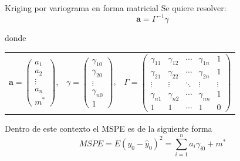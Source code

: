 \documentclass[12pts]{beamer}
\begin{document}
	\begin{frame}{Kriging por variograma en forma matricial}
		Se quiere resolver:
		\begin{equation}
		\mathbf{a} = \Gamma^{-1} \gamma\label{ecuacion_predictiva_variograma}
		\end{equation}
		
		\noindent donde
		
		\begin{table}[h]
			\centering
			\begin{tabular}{ccc}
				$\mathbf{a} = \begin{pmatrix}
				a_1 \\ a_2 \\ \vdots\\ a_n \\ m^*
				\end{pmatrix}$, & $\gamma = \begin{pmatrix}
				\gamma_{10} \\ \gamma_{20} \\ \vdots \\ \gamma_{n0} \\ 1
				\end{pmatrix}$, & $\Gamma = \begin{pmatrix}
				\gamma_{11} & \gamma_{12} & \cdots & \gamma_{1n} & 1 \\
				\gamma_{21} & \gamma_{22} & \cdots & \gamma_{2n} & 1 \\
				\vdots & \vdots & \ddots & \vdots & \vdots \\
				\gamma_{n1} & \gamma_{n2} & \cdots & \gamma_{nn} & 1 \\
				1 & 1 & \cdots & 1 & 0 
				\end{pmatrix}$
			\end{tabular}
		\end{table}
		
		Dentro de este contexto el MSPE es de la siguiente forma 		
		\begin{equation}
		MSPE = E\left(y_0 - \hat{y}_0\right)^2 = \sum_{i=1}^{n}a_i\gamma_{i0} + m^*\label{MSPE_variograma2}
		\end{equation}
	\end{frame}
\end{document}
